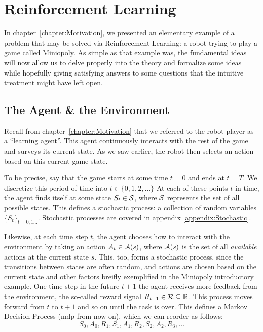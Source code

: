 \chapter{Reinforcement Learning}
\label{chapter:ReinforcementLearning}

In chapter~\ref{chapter:Motivation}, we presented an elementary example of a
problem that may be solved via Reinforcement Learning: a robot trying to play a
game called Miniopoly. As simple as that example was, the fundamental ideas will
now allow us to delve properly into the theory and formalize some ideas while
hopefully giving satisfying answers to some questions that the intuitive
treatment might have left open.

\section{The Agent \& the Environment}

Recall from chapter~\ref{chapter:Motivation} that we referred to the robot
player as a ``learning agent''. This agent continuously interacts with the rest
of the game and surveys its current state. As we saw earlier, the robot then
selects an action based on this current game state.

To be precise, say that the game starts at some time $t=0$ and ends at $t=T$. We
discretize this period of time into $t \in \{0, 1, 2, \ldots \}$ At each of
these points $t$ in time, the agent finds itself at some state $S_t \in
\mathcal{S}$, where $\mathcal{S}$ represents the set of all possible states. This
defines a stochastic process: a collection of random variables $\{ S_t \}_{t = 0, 1
\ldots}$. Stochastic processes are covered in appendix
\ref{appendix:Stochastic}.

Likewise, at each time step $t$, the agent chooses how to interact with the
environment by taking an action $A_t \in \mathcal{A}(s)$, where $\mathcal{A}(s)$ is
the set of all \textit{available} actions at the current state $s$. This, too,
forms a stochastic process, since the transitions between states are often
random, and actions are chosen based on the current state and other factors
breifly exemplified in the Miniopoly introductory example. One time step in the
future $t+1$ the agent receives more feedback from the environment, the
so-called reward signal $R_{t+1} \in \mathcal{R} \subseteq \mathbb{R}$. This process moves
forward from $t$ to $t+1$ and so on until the task is over. This defines a
Markov Decision Process (\acs{mdp} from now on), which we can reorder as
follows:
\begin{equation}
	\label{eq:mdp-succession}
	S_0, A_0, R_1, S_1, A_1, R_2, S_2, A_2, R_3, \ldots
\end{equation}

